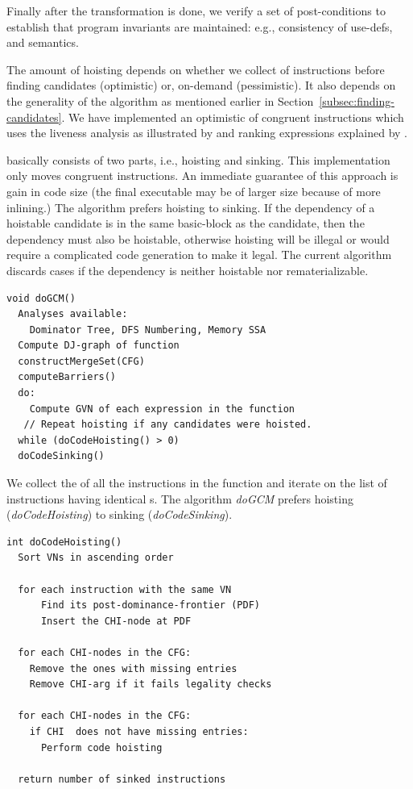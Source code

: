 \documentclass[sigplan,10pt,review,anonymous]{acmart}\settopmatter{printfolios=true,printccs=false,printacmref=false}
\begin{document}
Finally after the transformation is done, we verify a set of post-conditions to
establish that program invariants are maintained: e.g., consistency of use-defs,
and \SSA{} semantics.

The amount of hoisting depends on whether we collect \GVN{} of instructions
before finding candidates (optimistic) or, on-demand (pessimistic). It also
depends on the generality of the \GVN{} algorithm as mentioned earlier in
Section~\ref{subsec:finding-candidates}. We have implemented an optimistic
\gcm{} of congruent instructions which uses the liveness analysis as
illustrated by \citet{das2012} and ranking expressions explained by
\citet{rosen1988global}.

\GCM{} basically consists of two parts, i.e., hoisting and sinking. This
implementation only moves congruent instructions. An immediate guarantee of this
approach is gain in code size (the final executable may be of larger size
because of more inlining.) The algorithm prefers hoisting to sinking. If the
dependency of a hoistable candidate is in the same basic-block as the candidate,
then the dependency must also be hoistable, otherwise hoisting will be illegal or
would require a complicated code generation to make it legal. The current
algorithm discards cases if the dependency is neither hoistable nor
rematerializable.

\begin{verbatim}
void doGCM()
  Analyses available:
    Dominator Tree, DFS Numbering, Memory SSA
  Compute DJ-graph of function
  constructMergeSet(CFG)
  computeBarriers()
  do:
    Compute GVN of each expression in the function
   // Repeat hoisting if any candidates were hoisted.
  while (doCodeHoisting() > 0)
  doCodeSinking()
\end{verbatim}

We collect the \GVN{} of all the instructions in the function and iterate on the
list of instructions having identical \GVN{}s. The algorithm \emph{doGCM}
prefers hoisting (\emph{doCodeHoisting}) to sinking (\emph{doCodeSinking}).


\begin{verbatim}
int doCodeHoisting()
  Sort VNs in ascending order
  
  for each instruction with the same VN
      Find its post-dominance-frontier (PDF)
      Insert the CHI-node at PDF
  
  for each CHI-nodes in the CFG:
    Remove the ones with missing entries
    Remove CHI-arg if it fails legality checks
  
  for each CHI-nodes in the CFG:
    if CHI  does not have missing entries:
      Perform code hoisting

  return number of sinked instructions
\end{verbatim}
\end{document}
